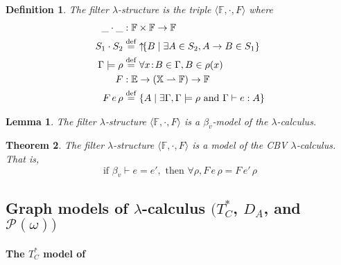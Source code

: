 \documentclass{tufte-handout}
\newcommand{\defeq}[0]{\overset{\mathrm{def}}{=}}
\newcommand{\of}[0]{\!:\!}
\newcommand{\pto}[0]{\rightharpoonup}
\newcommand{\VAR}[0]{\mathbb{X}}
\newtheorem{theorem}{Theorem}%
\newtheorem{lemma}[theorem]{Lemma}
\newtheorem{definition}{Definition}%
\begin{document}
\begin{definition}
  The \emph{filter $\lambda$-structure} is the triple $\langle
  \mathbb{F}, \cdot, F\rangle$ where
\begin{align*}
  \_ \cdot \_ & : \mathbb{F} \times \mathbb{F} \to \mathbb{F}\\
  S_1 \cdot S_2 &\defeq \UP{\{ B \mid \exists A \in S_2, A \to B \in S_1 \}}\\
  \Gamma \models \rho &\defeq \forall x\of B \in \Gamma, B \in \rho(x) \\
  F &: \mathbb{E} \to (\VAR \pto \mathbb{F}) \to \mathbb{F}\\
  F\,e\,\rho &\defeq \{ A \mid \exists \Gamma, \Gamma \models \rho \text{ and } \Gamma \vdash e : A\} 
\end{align*}
\end{definition}


\begin{lemma}
  The filter $\lambda$-structure $\langle \mathbb{F}, \cdot, F\rangle$
  is a $\beta_v$-model of the $\lambda$-calculus.
\end{lemma}

\begin{theorem}
  The filter $\lambda$-structure $\langle \mathbb{F}, \cdot, F\rangle$
  is a model of the CBV $\lambda$-calculus. That is,
  \[
  \text{if } \beta_v \vdash e = e', 
  \text{ then } \forall \rho, F\,e\,\rho = F\,e'\,\rho
  \]
\end{theorem}

\subsection{Graph models of $\lambda$-calculus $(T^{*}_C$, $D_A$, and $\mathcal{P}(\omega))$ }
\label{sec:graph-models}



\paragraph{The $T^{*}_C$ model of \citet{Plotkin:1972aa}}
\label{sec:t-c}


\newcommand{\EP}[0]{E_P}
\newcommand{\PSEM}[1]{\EP\,#1\,}
\end{document}
